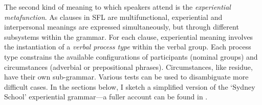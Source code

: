 



			The second kind of meaning to which speakers attend is the \emph{experiential metafunction}. As clauses in SFL are multifunctional, experiential and interpersonal meanings are expressed simultaneously, but through different subsystems within the grammar. For each clause, experiential meaning  involves the instantiation of a \emph{verbal process type} within the verbal group. Each process type constrains the available configurations of participants (nominal groups) and circumstances (adverbial or prepositional phrases). Circumstances, like residue, have their own sub-grammar. Various tests can be used to disambiguate more difficult cases. In the sections below, I sketch a simplified version of the `Sydney School' experiential grammar---a fuller account can be found in \cite[pp.~220--270]{eggins_introduction_2004}.

